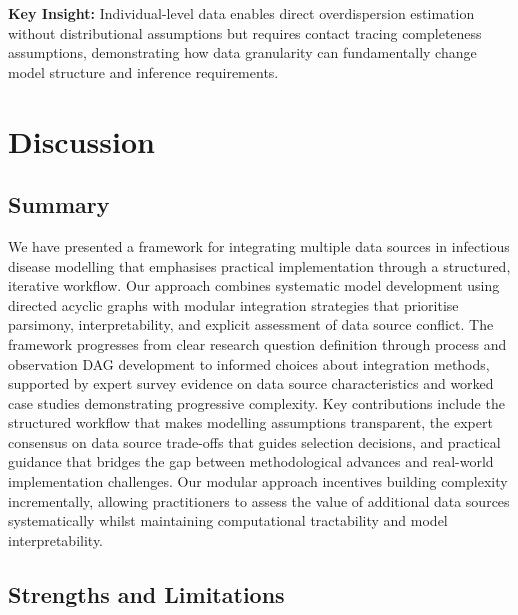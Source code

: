\documentclass{article}
\begin{document}
\textbf{Key Insight:} Individual-level data enables direct overdispersion estimation without distributional assumptions but requires contact tracing completeness assumptions, demonstrating how data granularity can fundamentally change model structure and inference requirements.

\section{Discussion}

\subsection{Summary}

We have presented a framework for integrating multiple data sources in infectious disease modelling that emphasises practical implementation through a structured, iterative workflow.
Our approach combines systematic model development using directed acyclic graphs with modular integration strategies that prioritise parsimony, interpretability, and explicit assessment of data source conflict.
The framework progresses from clear research question definition through process and observation DAG development to informed choices about integration methods, supported by expert survey evidence on data source characteristics and worked case studies demonstrating progressive complexity.
Key contributions include the structured workflow that makes modelling assumptions transparent, the expert consensus on data source trade-offs that guides selection decisions, and practical guidance that bridges the gap between methodological advances and real-world implementation challenges.
Our modular approach incentives building complexity incrementally, allowing practitioners to assess the value of additional data sources systematically whilst maintaining computational tractability and model interpretability.

\subsection{Strengths and Limitations}
\end{document}
